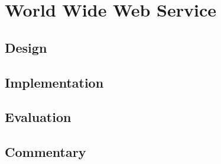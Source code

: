\section{World Wide Web Service}
\label{sec:web}

\subsection{Design}

\subsection{Implementation}

\subsection{Evaluation}

\subsection{Commentary}